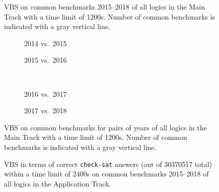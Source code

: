 \documentclass[dvipsnames,table,twoside,11pt]{article}
\newcommand{\maintrack}{Main Track\xspace}
\newcommand{\apptrack}{Application Track\xspace}
\begin{document}

\begin{figure}
  \centering
  \caption{VBS on common benchmarks 2015--2018 of all logics in the \maintrack
  with a time limit of 1200s. Number of common benchmarks is indicated with a
  gray vertical line.}
  \label{fig:progress-all}
\end{figure}

\begin{figure}
  \begin{subfigure}[t]{0.5\textwidth}
    \caption{2014 vs.~2015}
  \end{subfigure}
  \begin{subfigure}[t]{0.5\textwidth}
    \caption{2015 vs.~2016}
  \end{subfigure}
  \\[2ex]
  \begin{subfigure}[t]{0.5\textwidth}
    \caption{2016 vs.~2017}
  \end{subfigure}
  \begin{subfigure}[t]{0.5\textwidth}
    \caption{2017 vs.~2018}
  \end{subfigure}
  \caption{VBS on common benchmarks for pairs of years of all logics in the
  \maintrack with a time limit of 1200s. Number of common benchmarks is
  indicated with a gray vertical line.}
  \label{fig:progress}
\end{figure}

\begin{figure}
  \centering
  \vspace{-5ex}
  \caption{VBS in terms of correct \texttt{check-sat} answers
  (out of 30370517 total)
  within a time limit of 2400s
  on common benchmarks 2015--2018 of all logics in the \apptrack.}
  \label{fig:progress-all-app}
\end{figure}
\end{document}
